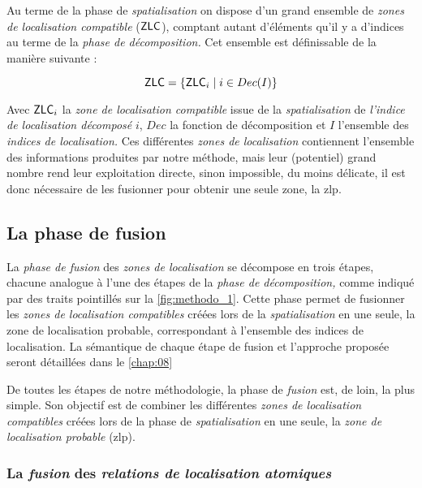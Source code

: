 Au terme de la phase de \emph{spatialisation} on dispose d'un grand
ensemble de \emph{zones de localisation compatible}
(\(\text{\textsf{ZLC}}\)), comptant autant d'éléments qu'il y a
d'indices au terme de la \emph{phase de décomposition.} Cet ensemble
est définissable de la manière suivante :

\begin{equation}
  \text{\textsf{ZLC}} = \{\text{\textsf{ZLC}}_i \mid i \in Dec(I)\}
\end{equation}

Avec \(\text{\textsf{ZLC}}_i\) la \emph{zone de localisation
  compatible} issue de la \emph{spatialisation} de \emph{l'indice de
  localisation décomposé} \(i\), \(Dec\) la fonction de décomposition
et \(I\) l'ensemble des \emph{indices de localisation.} Ces
différentes \emph{zones de localisation} contiennent l'ensemble des
informations produites par notre méthode, mais leur (potentiel) grand
nombre rend leur exploitation directe, sinon impossible, du moins
délicate, il est donc nécessaire de les fusionner pour obtenir une
seule zone, la \ac{zlp}.

\subsection{La phase de fusion}

La \emph{phase de fusion} des \emph{zones de localisation} se
décompose en trois étapes, chacune analogue à l'une des étapes de la
\emph{phase de décomposition,} comme indiqué par des traits pointillés
sur la \autoref{fig:methodo_1}. Cette phase permet de fusionner les
\emph{zones de localisation compatibles} créées lors de la
\emph{spatialisation} en une seule, la zone de localisation probable,
correspondant à l'ensemble des indices de localisation. La sémantique
de chaque étape de fusion et l'approche proposée seront détaillées
dans le \autoref{chap:08}

De toutes les étapes de notre méthodologie, la phase de \emph{fusion}
est, de loin, la plus simple. Son objectif est de combiner les
différentes \emph{zones de localisation compatibles} créées lors de la
phase de \emph{spatialisation} en une seule, la \emph{zone de
  localisation probable} (\ac{zlp}).

\subsubsection{La \emph{fusion} des \emph{relations de localisation
    atomiques}}

